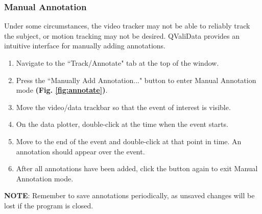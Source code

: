 \documentclass[]{article}
\begin{document}
	\subsubsection{Manual Annotation}
		Under some circumstances, the video tracker may not be able to reliably track the subject, or motion tracking may not be desired. QValiData provides an intuitive interface for manually adding annotations.
		\begin{enumerate}
			\item Navigate to the ``Track/Annotate" tab at the top of the window.
			\item Press the ``Manually Add Annotation..." button to enter Manual Annotation mode \textbf{(Fig. \ref{fig:annotate})}.
			\item Move the video/data trackbar so that the event of interest is visible. 
			\item On the data plotter, double-click at the time when the event starts.
			\item Move to the end of the event and double-click at that point in time. An annotation should appear over the event.
			\item After all annotations have been added, click the button again to exit Manual Annotation mode.
		\end{enumerate}
	\textbf{NOTE}: Remember to save annotations periodically, as unsaved changes will be lost if the program is closed.
\end{document}
